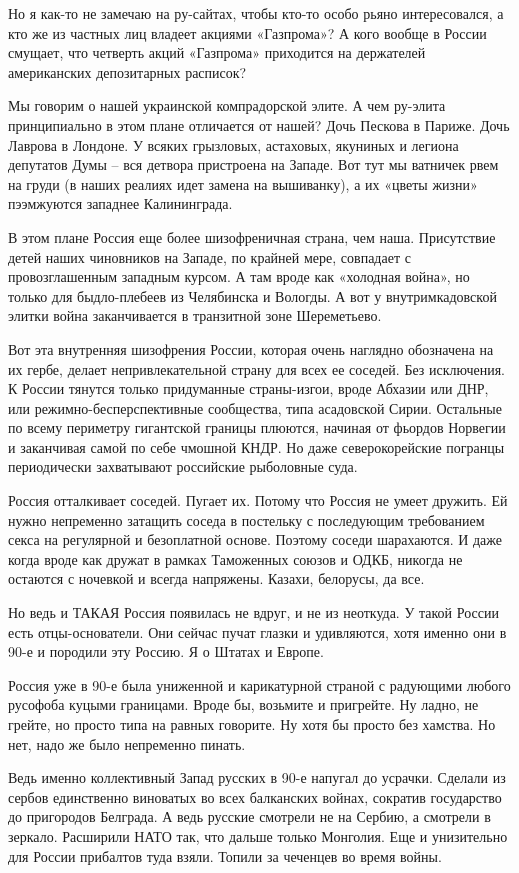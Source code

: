 Но я как-то не замечаю на ру-сайтах, чтобы кто-то особо рьяно интересовался, а
кто же из частных лиц владеет акциями «Газпрома»? А кого вообще в России
смущает, что четверть акций «Газпрома» приходится на держателей американских
депозитарных расписок?

Мы говорим о нашей украинской компрадорской элите. А чем ру-элита принципиально
в этом плане отличается от нашей? Дочь Пескова в Париже. Дочь Лаврова в
Лондоне. У всяких грызловых, астаховых, якуниных и легиона депутатов Думы – вся
детвора пристроена на Западе. Вот тут мы ватничек рвем на груди (в наших
реалиях идет замена на вышиванку), а их «цветы жизни» пээмжуются западнее
Калининграда.

В этом плане Россия еще более шизофреничная страна, чем наша. Присутствие детей
наших чиновников на Западе, по крайней мере, совпадает с провозглашенным
западным курсом. А там вроде как «холодная война», но только для быдло-плебеев
из Челябинска и Вологды. А вот у внутримкадовской элитки война заканчивается в
транзитной зоне Шереметьево.

Вот эта внутренняя шизофрения России, которая очень наглядно обозначена на их
гербе, делает непривлекательной страну для всех ее соседей. Без исключения. К
России тянутся только придуманные страны-изгои, вроде Абхазии или ДНР, или
режимно-бесперспективные сообщества, типа асадовской Сирии. Остальные по всему
периметру гигантской границы плюются, начиная от фьордов Норвегии и заканчивая
самой по себе чмошной КНДР. Но даже северокорейские погранцы периодически
захватывают российские рыболовные суда.

Россия отталкивает соседей. Пугает их. Потому что Россия не умеет дружить. Ей
нужно непременно затащить соседа в постельку с последующим требованием секса на
регулярной и безоплатной основе. Поэтому соседи шарахаются. И даже когда вроде
как дружат в рамках Таможенных союзов и ОДКБ, никогда не остаются с ночевкой и
всегда напряжены. Казахи, белорусы, да все.

Но ведь и ТАКАЯ Россия появилась не вдруг, и не из неоткуда. У такой России
есть отцы-основатели. Они сейчас пучат глазки и удивляются, хотя именно они в
90-е и породили эту Россию. Я о Штатах и Европе.

Россия уже в 90-е была униженной и карикатурной страной с радующими любого
русофоба куцыми границами. Вроде бы, возьмите и пригрейте. Ну ладно, не грейте,
но просто типа на равных говорите. Ну хотя бы просто без хамства. Но нет, надо
же было непременно пинать.

Ведь именно коллективный Запад русских в 90-е напугал до усрачки. Сделали из
сербов единственно виноватых во всех балканских войнах, сократив государство до
пригородов Белграда. А ведь русские смотрели не на Сербию, а смотрели в
зеркало. Расширили НАТО так, что дальше только Монголия. Еще и унизительно для
России прибалтов туда взяли. Топили за чеченцев во время войны.

